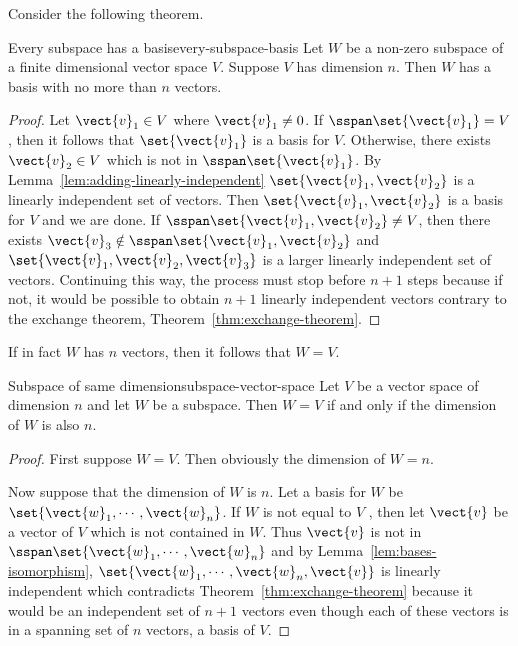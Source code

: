 Consider the following theorem. 

\begin{theorem}{Every subspace has a basis}{every-subspace-basis}
Let $W$ be a non-zero subspace of a finite dimensional vector
space $V$. Suppose $V$ has dimension $n$.
Then $W$ has a basis
with no more than $n$ vectors.
\end{theorem}

\begin{proof}
Let $\vect{v}_{1}\in V$ where $\vect{v}_{1}\neq 0$. If $
\sspan\set{\vect{v}_{1}} =V$, then it follows that $\set{\vect{v}
_{1}} $ is a basis for $V$. Otherwise, there exists $\vect{v}
_{2}\in V$ which is not in $\sspan\set{\vect{v}_{1}}$. By
Lemma~\ref{lem:adding-linearly-independent} $\set{\vect{v}_{1},\vect{v}_{2}} $ is a
linearly independent set of vectors. Then $\set{\vect{v}_{1},\vect{v}
_{2}} $ is a basis for $V$ and we are done. If $\sspan\set{\vect{v}_{1},
\vect{v}_{2}} \neq V$, then there exists $\vect{v}_{3}\notin \sspan\set{\vect{v}_{1},\vect{v}_{2}} $ and $\set{\vect{v}
_{1},\vect{v}_{2},\vect{v}_{3}} $ is a larger linearly
independent set of vectors. Continuing this way, the process must stop
before $n+1$ steps because if not, it would be possible to obtain $n+1$
linearly independent vectors contrary to the exchange theorem, Theorem~\ref{thm:exchange-theorem}. 
\end{proof}

If in fact $W$ has $n$ vectors, then it follows that $W=V$. 

\begin{theorem}{Subspace of same dimension}{subspace-vector-space}
Let $V$ be a vector space of dimension $n$ and let $W$ be a
subspace. Then $W=V$ if and only if the dimension of $W$ is also $n$.
\end{theorem}

\begin{proof}First suppose $W=V$. Then obviously the dimension of $W=n$.

Now suppose that the dimension of $W$ is $n$. Let a basis for $W$ be $
\set{\vect{w}_{1},\cdots ,\vect{w}_{n}}$. If $W$ is not equal to $V$
, then let $\vect{v}$ be a vector of $V$ which is not contained in $W$. Thus $
\vect{v}$ is not in $\sspan\set{\vect{w}_{1},\cdots ,\vect{w}
_{n}} $ and by Lemma~\ref{lem:bases-isomorphism}, $\set{\vect{w}_{1},\cdots ,\vect{w}_{n},\vect{v}} $ is linearly independent which contradicts
Theorem~\ref{thm:exchange-theorem} because it would be an independent set of $n+1$
vectors even though each of these vectors is in a spanning set of $n$
vectors, a basis of $V$. 
\end{proof}

